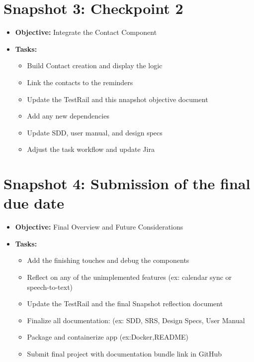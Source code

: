 \documentclass{article}
\begin{document}
\section*{Snapshot 3: Checkpoint 2}
\begin{itemize}
\item \textbf{Objective:} Integrate the  Contact Component
\item \textbf{Tasks:}
\begin{itemize}
\item Build Contact creation and display the logic
\item Link the contacts to the reminders
\item Update the TestRail and this nnapshot objective document
\item Add any new dependencies
\item Update SDD, user manual, and design specs
\item Adjust the task workflow and update Jira 
\end{itemize}
\end{itemize}

\section*{Snapshot 4: Submission of the final due date}
\begin{itemize}
\item \textbf{Objective:} Final Overview and Future Considerations
\item \textbf{Tasks:}
\begin{itemize}
\item Add the finishing touches and debug the components
\item Reflect on any of the unimplemented features (ex: calendar sync or speech-to-text)
\item Update the TestRail and the final Snapshot reflection document
\item Finalize all documentation: (ex: SDD, SRS, Design Specs, User Manual
\item Package and containerize app (ex:Docker,README)
\item Submit final project with documentation bundle link in GitHub
\end{itemize}
\end{itemize}
\end{document}
